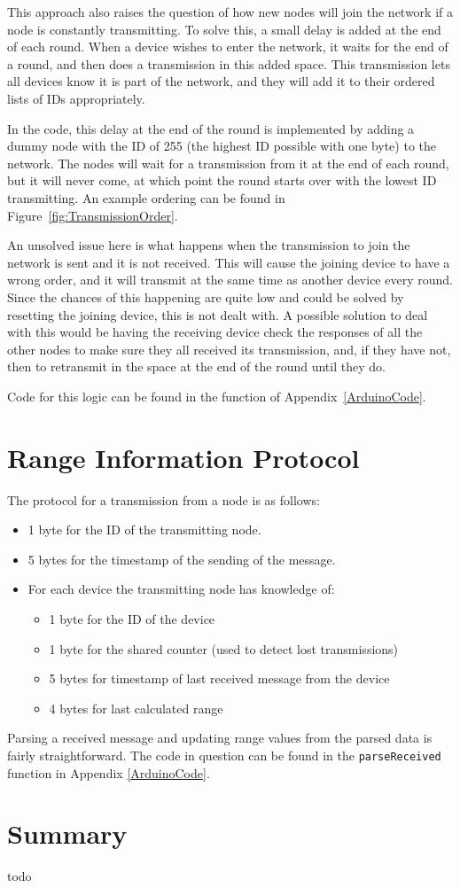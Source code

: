 This approach also raises the question of how new nodes will join the network if a node is constantly transmitting. To solve this, a small delay is added at the end of each round. When a device wishes to enter the network, it waits for the end of a round, and then does a transmission in this added space. This transmission lets all devices know it is part of the network, and they will add it to their ordered lists of IDs appropriately. 

In the code, this delay at the end of the round is implemented by adding a dummy node with the ID of 255 (the highest ID possible with one byte) to the network. The nodes will wait for a transmission from it at the end of each round, but it will never come, at which point the round starts over with the lowest ID transmitting. An example ordering can be found in Figure~\ref{fig:TransmissionOrder}.

An unsolved issue here is what happens when the transmission to join the network is sent and it is not received. This will cause the joining device to have a wrong order, and it will transmit at the same time as another device every round. Since the chances of this happening are quite low and could be solved by resetting the joining device, this is not dealt with. A possible solution to deal with this would be having the receiving device check the responses of all the other nodes to make sure they all received its transmission, and, if they have not, then to retransmit in the space at the end of the round until they do.

Code for this logic can be found in the  function of Appendix~\ref{ArduinoCode}.

\section{Range Information Protocol}
The protocol for a transmission from a node is as follows:

\begin{itemize}
	\item 1 byte for the ID of the transmitting node.
	\item 5 bytes for the timestamp of the sending of the message.
	\item For each device the transmitting node has knowledge of:
	\begin{itemize}
		\item 1 byte for the ID of the device
		\item 1 byte for the shared counter (used to detect lost transmissions)
		\item 5 bytes for timestamp of last received message from the device
		\item 4 bytes for last calculated range	
	\end{itemize} 
\end{itemize}

Parsing a received message and updating range values from the parsed data is fairly straightforward. The code in question can be found in the \texttt{parseReceived} function in Appendix \ref{ArduinoCode}.

\section{Summary}
todo



